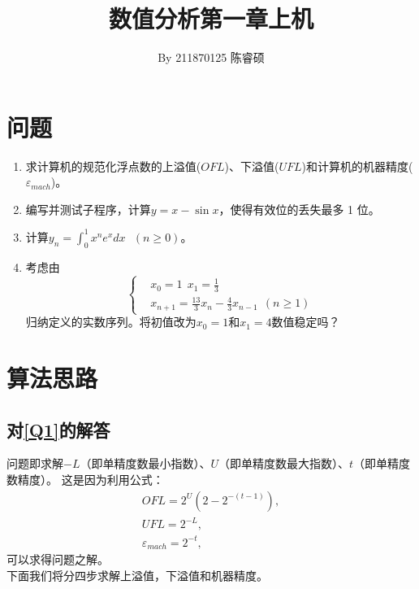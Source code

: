 \documentclass[a4paper,11pt,notitlepage]{article}
\title{\vspace{-1.5cm} \textbf{\huge{数值分析第一章上机}}\vspace{-1em}}
\author{By 211870125 陈睿硕}
\date{}
\begin{document}
\maketitle
\vspace{-1cm}
\thispagestyle{fancy}

\section{问题}
\begin{adjustwidth}{1em}{0pt}
\begin{enumerate}[label=\textbf{Q\arabic*}]
    \item 求计算机的规范化浮点数的上溢值($OFL$)、下溢值($UFL$)和计算机的机器精度($\varepsilon_{mach}$)。\label{Q1}\notag
    \item 编写并测试子程序，计算$y = x - \sin{x}$，使得有效位的丢失最多 1 位。 \label{Q2}\notag
    \item 计算$y_{n} = \int_{0}^{1} x^{n} e^{x} dx\ \ \ (n \geq 0)$。 \label{Q3}\notag
    \item 考虑由
    \begin{equation*}
        \left\{
        \begin{aligned}
        & x_{0}=1\ \ x_{1}=\frac{1}{3}\\
        & x_{n+1}=\frac{13}{3}x_{n}-\frac{4}{3}x_{n-1}\ \ (n\geq1)
        \end{aligned}
        \right.
        \end{equation*}
    归纳定义的实数序列。将初值改为$x_{0}=1$和$x_{1}=4$数值稳定吗？ \label{Q4}\notag
\end{enumerate}
\end{adjustwidth}

\section{算法思路}
\subsection{对\ref{Q1}的解答}
问题即求解$-L$（即单精度数最小指数）、$U$（即单精度数最大指数）、$t$（即单精度数精度）。
这是因为利用公式：
\begin{gather}
    OFL = 2^{U} (2 - 2^{-(t-1)}), \label{eq:1.1}\\
    UFL = 2^{-L}, \label{eq:1.2}\\
    \varepsilon_{mach} = 2^{-t}, \label{eq:1.3}
\end{gather}
可以求得问题之解。\\
\indent 下面我们将分四步求解上溢值，下溢值和机器精度。
\end{document}
